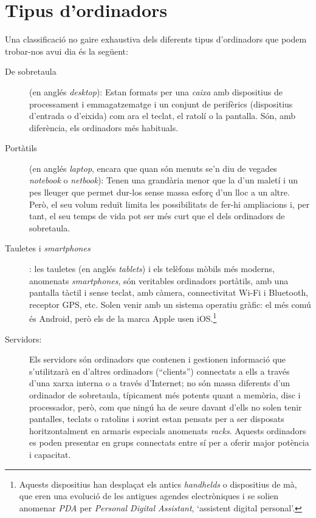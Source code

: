 \section{Tipus d'ordinadors}
Una classificació no gaire exhaustiva dels diferents tipus
d'ordinadors que podem trobar-nos avui dia és la següent:

\begin{description}
\item[De sobretaula] (en anglés \emph{desktop}): Estan formats per una
  \emph{caixa} amb dispositius de processament i emmagatzematge i un
  conjunt de perifèrics (dispositius d'entrada o d'eixida) com ara el
  teclat, el ratolí o la pantalla.  Són, amb diferència, els
  ordinadors més habituals.
\item[Portàtils] (en anglés \emph{laptop}, encara que quan són menuts
  se'n diu de vegades \emph{notebook} o \emph{netbook}): Tenen una
  grandària menor que la d'un maletí i un pes lleuger que permet
  dur-los sense massa esforç d'un lloc a un altre. Però, el seu volum
  reduït limita les possibilitats de fer-hi ampliacions i, per tant,
  el seu temps de vida pot ser més curt que el dels ordinadors de
  sobretaula. 
\item[Tauletes i \emph{smartphones}]: les tauletes (en anglés
  \emph{tablets}) i els telèfons mòbils més moderns, anomenats
  \emph{smartphones}, són veritables ordinadors por\-tà\-tils, amb una
  pantalla tàctil i sense teclat, amb càmera, connectivitat Wi-Fi i
  Bluetooth, receptor GPS, etc. Solen venir amb un sistema operatiu
  gràfic: el més comú és Android, però els de la marca Apple usen
  iOS.\footnote{Aquests dispositius han desplaçat els antics
    \emph{handhelds} o dispositius de mà, que eren una evolució de les
    antigues agendes electròniques i se solien anomenar \emph{PDA} per
    \emph{Personal Digital Assistant}, `assistent digital personal'.}

\item[Servidors:] Els servidors són ordinadors que contenen i
  gestionen informació que s'utilitzarà en d'altres ordinadors
  (``clients'') connectats a ells a través d'una xarxa interna o a
  través d'Internet; no són massa diferents d'un ordinador de
  sobretaula, típicament més potents quant a memòria, disc i
  processador, però, com que ningú ha de seure davant d'ells no solen
  tenir pantalles, teclats o ratolins i sovint estan pensats per a ser
  disposats horitzontalment en armaris especials anomenats
  \emph{racks}.  Aquests ordinadors es poden presentar en grups
  connectats entre sí per a oferir major potència i capacitat.
\end{description}

